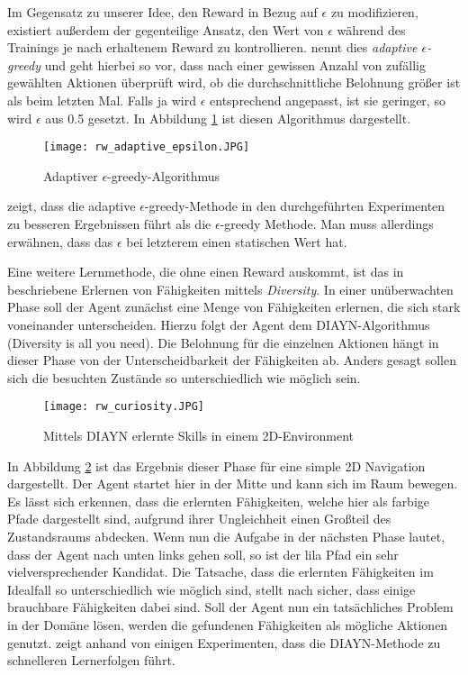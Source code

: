 Im Gegensatz zu unserer Idee, den Reward in Bezug auf $ \epsilon $ zu modifizieren, existiert außerdem der gegenteilige Ansatz, den Wert von $ \epsilon $ während des Trainings je nach erhaltenem Reward zu kontrollieren. \cite{r13_dos2017adaptive} nennt dies \textit{adaptive $ \epsilon $-greedy} und geht hierbei so vor, dass nach einer gewissen Anzahl von zufällig gewählten Aktionen überprüft wird, ob die durchschnittliche Belohnung größer ist als beim letzten Mal. Falls ja wird $ \epsilon $ entsprechend angepasst, ist sie geringer, so wird $ \epsilon $ aus 0.5 gesetzt. In Abbildung \ref{img:rwAdaptiveEpsilon} ist diesen Algorithmus dargestellt. 
\begin{figure}[h!]
    \centering
    \texttt{[image: rw\_adaptive\_epsilon.JPG]}
    \caption{Adaptiver $ \epsilon $-greedy-Algorithmus} \label{img:rwAdaptiveEpsilon}
\end{figure}
\cite{r13_dos2017adaptive} zeigt, dass die adaptive $ \epsilon $-greedy-Methode in den durchgeführten Experimenten zu besseren Ergebnissen führt als die $ \epsilon $-greedy Methode. Man muss allerdings erwähnen, dass das $ \epsilon $ bei letzterem einen statischen Wert hat.

Eine weitere Lernmethode, die ohne einen Reward auskommt, ist das in \cite{r02_eysenbach2018diversity} beschriebene Erlernen von Fähigkeiten mittels \textit{Diversity}. In einer unüberwachten Phase soll der Agent zunächst eine Menge von Fähigkeiten erlernen, die sich stark voneinander unterscheiden. Hierzu folgt der Agent dem DIAYN-Algorithmus (\glqq Diversity is all you need\grqq{}). Die Belohnung für die einzelnen Aktionen hängt in dieser Phase von der Unterscheidbarkeit der Fähigkeiten ab. Anders gesagt sollen sich die besuchten Zustände so unterschiedlich wie möglich sein.
\begin{figure}[h!]
    \centering
    \texttt{[image: rw\_curiosity.JPG]}
    \caption{Mittels DIAYN erlernte Skills in einem 2D-Environment} \label{img:rwCuriosity}
\end{figure}
In Abbildung \ref{img:rwCuriosity} ist das Ergebnis dieser Phase für eine simple 2D Navigation dargestellt. Der Agent startet hier in der Mitte und kann sich im Raum bewegen. Es lässt sich erkennen, dass die erlernten Fähigkeiten, welche hier als farbige Pfade dargestellt sind, aufgrund ihrer Ungleichheit einen Großteil des Zustandsraums abdecken. Wenn nun die Aufgabe in der nächsten Phase lautet, dass der Agent nach unten links gehen soll, so ist der lila Pfad ein sehr vielversprechender Kandidat. Die Tatsache, dass die erlernten Fähigkeiten im Idealfall so unterschiedlich wie möglich sind, stellt nach \cite{r02_eysenbach2018diversity} sicher, dass einige brauchbare Fähigkeiten dabei sind. Soll der Agent nun ein tatsächliches Problem in der Domäne lösen, werden die gefundenen Fähigkeiten als mögliche Aktionen genutzt. \cite{r02_eysenbach2018diversity} zeigt anhand von einigen Experimenten, dass die DIAYN-Methode zu schnelleren Lernerfolgen führt. 
